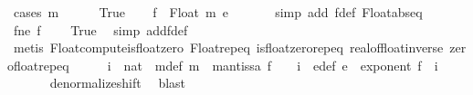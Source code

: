 \begin{isabellebody}
%
\isadelimproof
%
\endisadelimproof
%
\isatagproof
{}\isamarkupfalse%
\ {\isacharparenleft}{\kern0pt}cases\ {\isachardoublequoteopen}m\ {\isasymnoteq}\ {}{\isachardoublequoteclose}{\isacharparenright}{\kern0pt}\isanewline
\ \ \isamarkupfalse%
\ True\isanewline
\ \ \isamarkupfalse%
\ {\isachardoublequoteopen}f\ {\isacharequal}{\kern0pt}\ Float\ m\ e{\isachardoublequoteclose}\ \isanewline
\ \ \ \ \isamarkupfalse%
\ {\isacharparenleft}{\kern0pt}simp\ add{\isacharcolon}{\kern0pt}\ f{\isacharunderscore}{\kern0pt}def\ Float{\isachardot}{\kern0pt}abs{\isacharunderscore}{\kern0pt}eq{\isacharparenright}{\kern0pt}\isanewline
\ \ \isamarkupfalse%
\ \isamarkupfalse%
\ f{\isacharunderscore}{\kern0pt}ne{\isacharunderscore}{\kern0pt}{}{\isacharcolon}{\kern0pt}\ {\isachardoublequoteopen}f\ {\isasymnoteq}\ {}{\isachardoublequoteclose}\ \isamarkupfalse%
\ True\ \isamarkupfalse%
\ {\isacharparenleft}{\kern0pt}simp\ add{\isacharcolon}{\kern0pt}f{\isacharunderscore}{\kern0pt}def{\isacharparenright}{\kern0pt}\ \isanewline
\ \ \ \ \isamarkupfalse%
\ {\isacharparenleft}{\kern0pt}metis\ Float{\isachardot}{\kern0pt}compute{\isacharunderscore}{\kern0pt}is{\isacharunderscore}{\kern0pt}float{\isacharunderscore}{\kern0pt}zero\ Float{\isachardot}{\kern0pt}rep{\isacharunderscore}{\kern0pt}eq\ is{\isacharunderscore}{\kern0pt}float{\isacharunderscore}{\kern0pt}zero{\isachardot}{\kern0pt}rep{\isacharunderscore}{\kern0pt}eq\ real{\isacharunderscore}{\kern0pt}of{\isacharunderscore}{\kern0pt}float{\isacharunderscore}{\kern0pt}inverse\ zero{\isacharunderscore}{\kern0pt}float{\isachardot}{\kern0pt}rep{\isacharunderscore}{\kern0pt}eq{\isacharparenright}{\kern0pt}\isanewline
\ \ \isamarkupfalse%
\ \isamarkupfalse%
\ i\ {\isacharcolon}{\kern0pt}{\isacharcolon}{\kern0pt}\ nat\ \ m{\isacharunderscore}{\kern0pt}def{\isacharcolon}{\kern0pt}\ {\isachardoublequoteopen}m\ {\isacharequal}{\kern0pt}\ mantissa\ f\ {\isacharasterisk}{\kern0pt}\ {}\ {\isacharcircum}{\kern0pt}\ i{\isachardoublequoteclose}\ \ e{\isacharunderscore}{\kern0pt}def{\isacharcolon}{\kern0pt}\ {\isachardoublequoteopen}e\ {\isacharequal}{\kern0pt}\ exponent\ f\ {\isacharminus}{\kern0pt}\ i{\isachardoublequoteclose}\isanewline
\ \ \ \ \isamarkupfalse%
\ \ denormalize{\isacharunderscore}{\kern0pt}shift\ \isamarkupfalse%
\ blast\isanewline

\end{isabellebody}
